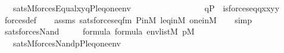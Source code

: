\begin{isabellebody}
\ \ \ {\isachardoublequoteopen}sats{\isacharparenleft}{\kern0pt}M{\isacharcomma}{\kern0pt}forces{\isacharparenleft}{\kern0pt}Equal{\isacharparenleft}{\kern0pt}x{\isacharcomma}{\kern0pt}y{\isacharparenright}{\kern0pt}{\isacharparenright}{\kern0pt}{\isacharcomma}{\kern0pt}{\isacharbrackleft}{\kern0pt}q{\isacharcomma}{\kern0pt}P{\isacharcomma}{\kern0pt}leq{\isacharcomma}{\kern0pt}one{\isacharbrackright}{\kern0pt}{\isacharat}{\kern0pt}env{\isacharparenright}{\kern0pt}\ {\isasymlongleftrightarrow}\isanewline
\ \ \ \ \ \ \ \ \ \ \ \ \ \ \ \ {\isacharparenleft}{\kern0pt}q{\isasymin}P\ {\isasymand}\ is{\isacharunderscore}{\kern0pt}forces{\isacharunderscore}{\kern0pt}eq{\isacharparenleft}{\kern0pt}q{\isacharcomma}{\kern0pt}xx{\isacharcomma}{\kern0pt}yy{\isacharparenright}{\kern0pt}{\isacharparenright}{\kern0pt}{\isachardoublequoteclose}\isanewline
%
\isadelimproof
\ \ %
\endisadelimproof
%
\isatagproof
{}\isamarkupfalse%
\ forces{\isacharunderscore}{\kern0pt}def\isanewline
\ \ \isamarkupfalse%
\ assms\ sats{\isacharunderscore}{\kern0pt}forces{\isacharunderscore}{\kern0pt}eq{\isacharunderscore}{\kern0pt}fm\ P{\isacharunderscore}{\kern0pt}in{\isacharunderscore}{\kern0pt}M\ leq{\isacharunderscore}{\kern0pt}in{\isacharunderscore}{\kern0pt}M\ one{\isacharunderscore}{\kern0pt}in{\isacharunderscore}{\kern0pt}M\isanewline
\ \ \isamarkupfalse%
\ simp%
\endisatagproof
{\isafoldproof}%
%
\isadelimproof
\isanewline
%
\endisadelimproof
\isanewline
{}\isamarkupfalse%
\ sats{\isacharunderscore}{\kern0pt}forces{\isacharunderscore}{\kern0pt}Nand\ {\isacharcolon}{\kern0pt}\isanewline
\ \ \ \ {\isachardoublequoteopen}{\isasymphi}{\isasymin}formula{\isachardoublequoteclose}\ {\isachardoublequoteopen}{\isasympsi}{\isasymin}formula{\isachardoublequoteclose}\ {\isachardoublequoteopen}env{\isasymin}list{\isacharparenleft}{\kern0pt}M{\isacharparenright}{\kern0pt}{\isachardoublequoteclose}\ {\isachardoublequoteopen}p{\isasymin}M{\isachardoublequoteclose}\isanewline
\ \ \ {\isachardoublequoteopen}sats{\isacharparenleft}{\kern0pt}M{\isacharcomma}{\kern0pt}forces{\isacharparenleft}{\kern0pt}Nand{\isacharparenleft}{\kern0pt}{\isasymphi}{\isacharcomma}{\kern0pt}{\isasympsi}{\isacharparenright}{\kern0pt}{\isacharparenright}{\kern0pt}{\isacharcomma}{\kern0pt}{\isacharbrackleft}{\kern0pt}p{\isacharcomma}{\kern0pt}P{\isacharcomma}{\kern0pt}leq{\isacharcomma}{\kern0pt}one{\isacharbrackright}{\kern0pt}{\isacharat}{\kern0pt}env{\isacharparenright}{\kern0pt}\ {\isasymlongleftrightarrow}\isanewline

\end{isabellebody}

